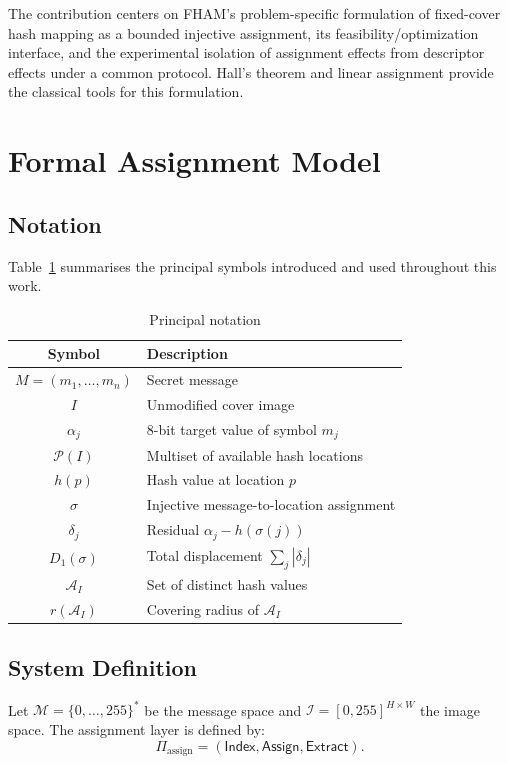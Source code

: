 \documentclass[preprint,12pt]{elsarticle}
\theoremstyle{plain}
\begin{document}
The contribution centers on FHAM's problem-specific formulation of fixed-cover
hash mapping as a bounded injective assignment, its feasibility/optimization
interface, and the experimental isolation of assignment effects from
descriptor effects under a common protocol. Hall's theorem and linear
assignment provide the classical tools for this formulation.
\section{Formal Assignment Model}
\label{sec:formal_model}

\subsection{Notation}
Table~\ref{tab:notation_valid} summarises the principal symbols introduced and used throughout this work.

\begin{table}[!t]
\centering
\caption{Principal notation}
\label{tab:notation_valid}
\begin{tabular}{c p{5.2cm}}
\toprule
\textbf{Symbol} & \textbf{Description} \\
\midrule
$M=(m_1,\ldots,m_n)$ & Secret message \\
$I$ & Unmodified cover image \\
$\alpha_j$ & 8-bit target value of symbol $m_j$ \\
$\mathcal{P}(I)$ & Multiset of available hash locations \\
$h(p)$ & Hash value at location $p$ \\
$\sigma$ & Injective message-to-location assignment \\
$\delta_j$ & Residual $\alpha_j-h(\sigma(j))$ \\
$D_1(\sigma)$ & Total displacement $\sum_j|\delta_j|$ \\
$\mathcal{A}_I$ & Set of distinct hash values \\
$r(\mathcal{A}_I)$ & Covering radius of $\mathcal{A}_I$ \\
\bottomrule
\end{tabular}
\end{table}

\subsection{System Definition}

Let $\mathcal{M} = \{0, \ldots, 255\}^*$ be the message space and
$\mathcal{I} = [0, 255]^{H \times W}$ the image space. The assignment layer is
defined by:
\[
    \Pi_{\mathrm{assign}} = (\mathsf{Index}, \mathsf{Assign}, \mathsf{Extract}).
\]
\end{document}
